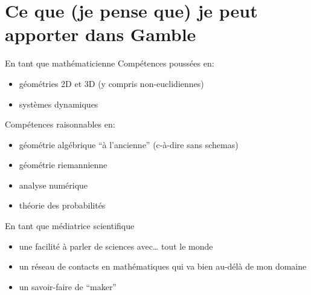 \documentclass[professionalfont, 12pt, dvipdfmx, default, cjk]{beamer}
\providecommand{\tightlist}{%
    \setlength{\itemsep}{0pt}\setlength{\parskip}{0pt}}
\begin{document}
\hypertarget{ce-que-je-pense-que-je-peut-apporter-dans-gamble}{%
\section{Ce que (je pense que) je peut apporter dans
Gamble}\label{ce-que-je-pense-que-je-peut-apporter-dans-gamble}}

\begin{frame}{En tant que mathématicienne}
\protect\hypertarget{en-tant-que-mathuxe9maticienne}{}
Compétences poussées en:

\begin{itemize}
\tightlist
\item
  géométries 2D et 3D (y compris non-euclidiennes)
\item
  systèmes dynamiques
\end{itemize}

Compétences raisonnables en:

\begin{itemize}
\tightlist
\item
  géométrie algébrique ``à l'ancienne'' (c-à-dire sans schemas)
\item
  géométrie riemannienne
\item
  analyse numérique
\item
  théorie des probabilités
\end{itemize}
\end{frame}

\begin{frame}{En tant que médiatrice scientifique}
\protect\hypertarget{en-tant-que-muxe9diatrice-scientifique}{}
\begin{itemize}
\tightlist
\item
  une facilité à parler de sciences avec\ldots{} tout le monde
\item
  un réseau de contacts en mathématiques qui va bien au-délà de mon
  domaine
\item
  un savoir-faire de ``maker''
\end{itemize}
\end{frame}
\end{document}
